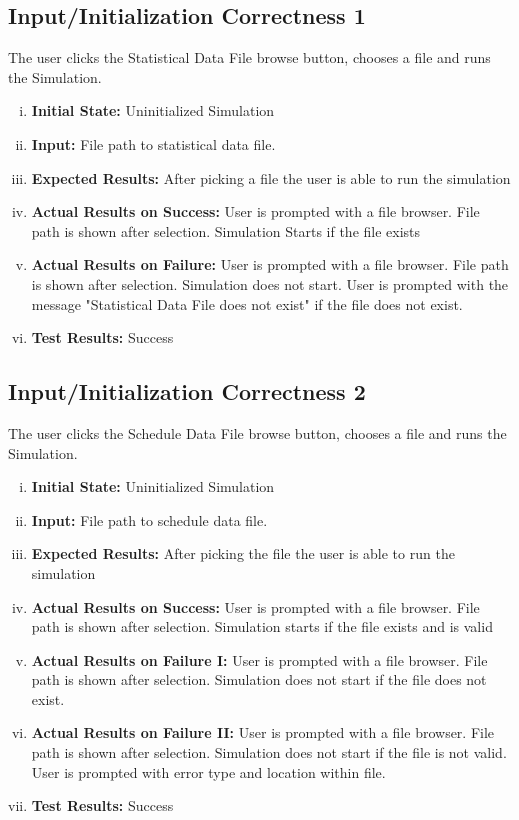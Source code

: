 \documentclass[paper=letter, fontsize=10pt]{scrartcl}
\numberwithin{equation}{section}		%
\numberwithin{figure}{section}			%
\numberwithin{table}{section}				%
\begin{document}
\subsection{Input/Initialization Correctness 1}
The user clicks the Statistical Data File browse button, chooses a file and runs the Simulation. 
\begin{enumerate}[(i)]
	\item \textbf{Initial State:} Uninitialized Simulation   
	\item \textbf{Input:} File path to statistical data file.
	\item \textbf{Expected Results:} After picking a file the user is able to run the simulation 
	\item \textbf{Actual Results on Success:} User is prompted with a file browser. File path is shown after selection. Simulation Starts if the file exists
	\item \textbf{Actual Results on Failure:} User is prompted with a file browser. File path is shown after selection. Simulation does not start. User is prompted with the message "Statistical Data File does not exist" if the file does not exist.
	\item \textbf{Test Results:} Success
\end{enumerate}
	
\subsection{Input/Initialization Correctness 2}
The user clicks the Schedule Data File browse button, chooses a file and runs the Simulation.
\begin{enumerate}[(i)]
	\item \textbf{Initial State:} Uninitialized Simulation   
	\item \textbf{Input:} File path to schedule data file.
	\item \textbf{Expected Results:} After picking the file the user is able to run the simulation
	\item \textbf{Actual Results on Success:} User is prompted with a file browser. File path is shown after selection. Simulation starts if the file exists and is valid
	\item \textbf{Actual Results on Failure I:} User is prompted with a file browser. File path is shown after selection. Simulation does not start if the file does not exist.
	\item \textbf{Actual Results on Failure II:} User is prompted with a file browser. File path is shown after selection. Simulation does not start if the file is not valid. User is prompted with error type and location within file.
		\item \textbf{Test Results:} Success
\end{enumerate}
\end{document}
